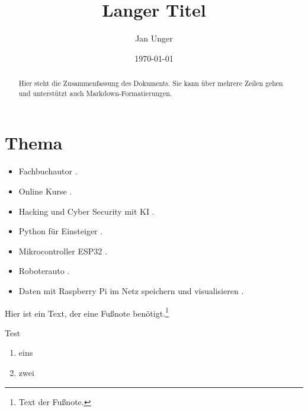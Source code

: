 \documentclass{vorlage-design-main}
\title{Langer Titel}
\author{Jan Unger}
\date{\today}
\providecommand{\tightlist}{%
  \setlength{\itemsep}{0pt}\setlength{\parskip}{0pt}}
\begin{document}
\maketitle

\begin{abstract}
Hier steht die Zusammenfassung des Dokuments. Sie kann über mehrere
Zeilen gehen und unterstützt auch Markdown-Formatierungen.
\end{abstract}

\section{Thema}\label{thema}

\begin{itemize}
\tightlist
\item
  Fachbuchautor \textcite{dalwigk:2024:fachbuchautor}.
\item
  Online Kurse \textcite{schaffranek:2024:kurse}.
\item
  Hacking und Cyber Security mit KI \textcite{dalwigk:2023:hacking}.
\item
  Python für Einsteiger \textcite{dalwigk:2022:python}.
\item
  Mikrocontroller ESP32 \textcite{brandes:2023:mikrocontroller}.
\item
  Roboterauto \textcite{brandes:2022:esp32}.
\item
  Daten mit Raspberry Pi im Netz speichern und visualisieren
  \textcite{brandes:2023:daten}.
\end{itemize}

Hier ist ein Text, der eine Fußnote benötigt.\footnote{Text der Fußnote.}

Test

\begin{enumerate}
\def\labelenumi{\arabic{enumi}.}
\tightlist
\item
  eins
\item
  zwei
\end{enumerate}


\clearpage
\printbibliography
\end{document}
